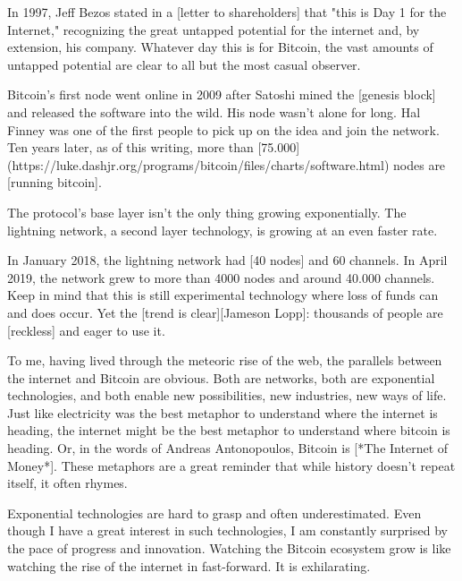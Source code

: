 {{In 1997, Jeff Bezos stated in a [letter to shareholders] that "this is
Day 1 for the Internet," recognizing the great untapped potential for
the internet and, by extension, his company. Whatever day this is for
Bitcoin, the vast amounts of untapped potential are clear to all but the
most casual observer.

{%


Bitcoin's first node went online in 2009 after Satoshi mined the
[genesis block] and released the software into the wild. His node wasn't
alone for long. Hal Finney was one of the first people to pick up on the
idea and join the network. Ten years later, as of this writing, more
than
[75.000](https://luke.dashjr.org/programs/bitcoin/files/charts/software.html)
nodes are [running bitcoin].

The protocol's base layer isn't the only thing growing exponentially.
The lightning network, a second layer technology, is growing at an even
faster rate.

In January 2018, the lightning network had [40 nodes] and 60 channels.
In April 2019, the network grew to more than 4000 nodes and around
40.000 channels. Keep in mind that this is still experimental technology
where loss of funds can and does occur. Yet the [trend is clear][Jameson Lopp]:
thousands of people are [reckless] and eager to use it.

{%

To me, having lived through the meteoric rise of the web, the parallels
between the internet and Bitcoin are obvious. Both are networks, both
are exponential technologies, and both enable new possibilities, new
industries, new ways of life. Just like electricity was the best
metaphor to understand where the internet is heading, the internet might
be the best metaphor to understand where bitcoin is heading. Or, in the
words of Andreas Antonopoulos, Bitcoin is [*The Internet of Money*].
These metaphors are a great reminder that while history doesn't repeat
itself, it often rhymes.

Exponential technologies are hard to grasp and often underestimated.
Even though I have a great interest in such technologies, I am
constantly surprised by the pace of progress and innovation. Watching
the Bitcoin ecosystem grow is like watching the rise of the internet in
fast-forward. It is exhilarating.

}}}}
